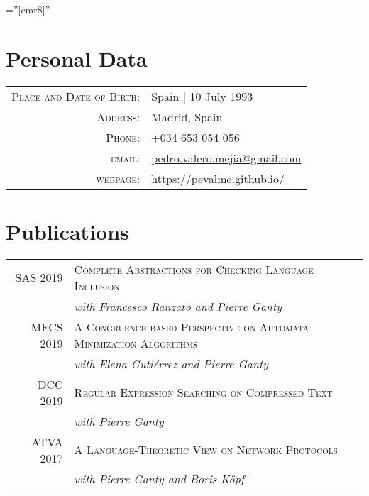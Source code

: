 \documentclass[a4paper,10pt]{article} %
\begin{document}
\pagestyle{empty} %

\font\fb=''[cmr8]'' %


\par{\bigskip\par} %

\section{Personal Data}

\begin{tabular}{rl}
\textsc{Place and Date of Birth:} & Spain  | 10 July 1993 \\
\textsc{Address:} & Madrid, Spain \\
\textsc{Phone:} & +034 653 054 056\\
\textsc{email:} & \href{mailto:pedro.valero.mejia@gmail.com}{pedro.valero.mejia@gmail.com} \\
\textsc{webpage:} & \href{https://pevalme.github.io/}{https://pevalme.github.io/}\\
\end{tabular}


\section{Publications}
\begin{tabular}{rl}
\textsc{SAS} 2019 & \textsc{Complete Abstractions for Checking Language Inclusion} \\
& \textit{with Francesco Ranzato and Pierre Ganty} \\
\textsc{MFCS} 2019 & \textsc{A Congruence-based Perspective on Automata Minimization Algorithms} \\
 & \textit{with Elena Gutiérrez and Pierre Ganty} \\
\textsc{DCC} 2019 & \textsc{Regular Expression Searching on Compressed Text} \\
 & \textit{with Pierre Ganty} \\
\textsc{ATVA} 2017 & \textsc{A Language-Theoretic View on Network Protocols} \\
& \textit{with Pierre Ganty and Boris Köpf} \\
\end{tabular}
\end{document}
